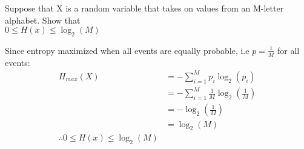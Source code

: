 

\begin{question}
Suppose that X is a random variable that takes on values from an M-letter alphabet. Show that \\
$ 0 \leq H(x) \leq \log_2(M) $

\end{question}
\begin{solution}
Since entropy maximized when all events are equally probable, i.e $p=\frac{1}{M}$ for all events: \\
\begin{equation}
\begin{aligned}
H_{max}(X) &= - \sum_{i=1}^{M} p_i \log_2( p_i )  \\
&= - \sum_{i=1}^{M} \frac{1}{M} \log_2( \frac{1}{M} ) \\
&= - \log_2( \frac{1}{M} ) \\
&= \log_2( M ) \\
\therefore 0 \leq H(x) \leq \log_2(M)
\end{aligned}
\end{equation}  
\end{solution}


